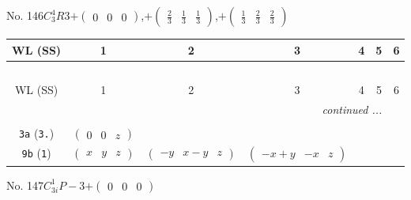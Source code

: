 \documentclass[fleqn,9pt,landscape]{jsarticle}
\begin{document}
\newpage
No. 146\quad$C_{3}^{4}$\quad$R3$\quad[ trigonal ]\quad$+\begin{pmatrix} 0 & 0 & 0 \end{pmatrix}$,\quad $+\begin{pmatrix} \frac{2}{3} & \frac{1}{3} & \frac{1}{3} \end{pmatrix}$,\quad $+\begin{pmatrix} \frac{1}{3} & \frac{2}{3} & \frac{2}{3} \end{pmatrix}$
\begin{center}
\renewcommand{\arraystretch}{1.2}
\begin{longtable}{ccccccc}
 \hline \hline
WL (SS) & 1 & 2 & 3 & 4 & 5 & 6 \\ \hline \endfirsthead

\multicolumn{6}{l}{\tablename\ \thetable{}} \\
 \hline \hline
WL (SS) & 1 & 2 & 3 & 4 & 5 & 6 \\ \hline \endhead

 \hline \hline
\multicolumn{6}{r}{\footnotesize\it continued ...} \\ \endfoot

 \hline \hline
\multicolumn{6}{r}{} \\ \endlastfoot

{\tt 3a} ({\tt 3.}) & $ \begin{pmatrix} 0 & 0 & z \end{pmatrix} $ & $  $ & $  $ \\ \hline
{\tt 9b} ({\tt 1}) & $ \begin{pmatrix} x & y & z \end{pmatrix} $ & $ \begin{pmatrix} - y & x - y & z \end{pmatrix} $ & $ \begin{pmatrix} - x + y & - x & z \end{pmatrix} $ \\
\end{longtable}
\end{center}
\newpage
No. 147\quad$C_{3i}^{1}$\quad$P-3$\quad[ trigonal ]\quad$+\begin{pmatrix} 0 & 0 & 0 \end{pmatrix}$
\end{document}
